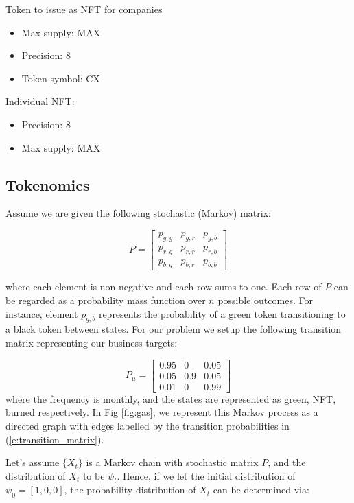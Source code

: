 \documentclass{article}
\begin{document}
Token to issue as NFT for companies
\begin{itemize}
\item Max supply: MAX
\item Precision: 8
\item Token symbol: CX
\end{itemize}

Individual NFT:
\begin{itemize}
\item Precision: 8
\item Max supply: MAX
\end{itemize}


\subsection{Tokenomics}
\label{section:token_model}

Assume we are given the following stochastic (Markov) matrix:

\begin{equation*}
P = 
\begin{bmatrix}
p_{g,g} & p_{g,r}  & p_{g,b} \\
p_{r,g} & p_{r,r}  & p_{r,b} \\
p_{b,g} & p_{b,r} & p_{b,b} 
\end{bmatrix}
\end{equation*}

where each element is non-negative and each row sums to one. Each row of $P$ can be regarded as a probability mass function over $n$ possible outcomes. For instance, element $p_{g,b}$ represents the probability of a green token transitioning to a black token
between states. For our problem we setup the following transition matrix representing our business targets:

\begin{equation}
P_{\mu} = 
\begin{bmatrix}
0.95 & 0  & 0.05 \\
0.05 & 0.9  & 0.05 \\
0.01 & 0 & 0.99
\end{bmatrix}
\label{e:transition_matrix}
\end{equation}
where the frequency is monthly, and the states are represented as green, NFT, burned respectively. In Fig \ref{fig:gas}, we represent this Markov process as a directed graph with edges labelled by the transition probabilities in (\ref{e:transition_matrix}).

Let's assume $\{X_{t}\}$ is a Markov chain with stochastic matrix $P$, and the distribution of $X_{t}$ to be $\psi_{t}$. Hence, if we let the initial distribution of $\psi_{0} = [1,0,0]$, the probability distribution of $X_{t}$ can be determined via:
\end{document}
